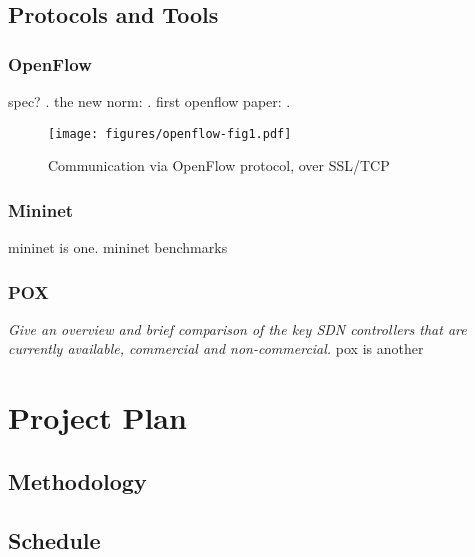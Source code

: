 \documentclass[pdftex,12pt,a4paper]{article}
\begin{document}
\subsection{Protocols and Tools}
\subsubsection{OpenFlow}
spec? \cite{onf:switch}. the new norm: \cite{onf:norm}. first openflow paper: \cite{mckeown:campus}.

\begin{figure}
\texttt{[image: figures/openflow-fig1.pdf]}
\caption{Communication via OpenFlow protocol, over SSL/TCP}
\end{figure}

\subsubsection{Mininet}
mininet is one. mininet benchmarks \cite{handigol:mininet}

\subsubsection{POX}
\emph{Give an overview and brief comparison of the key SDN controllers that are currently available, commercial and non-commercial.}
pox is another

\newpage
\section{Project Plan}
\subsection{Methodology}
\subsection{Schedule}
\end{document}
